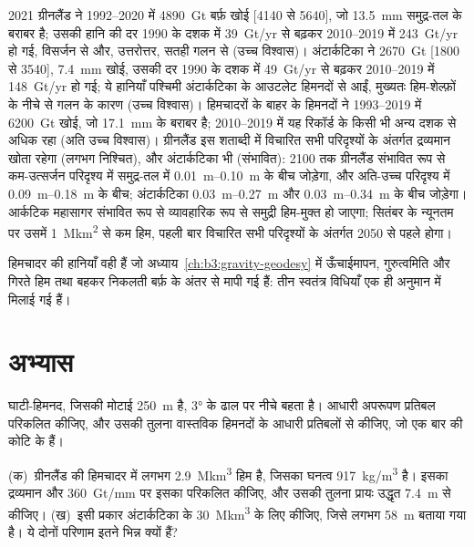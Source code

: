 \begin{dated}{2021}
ग्रीनलैंड ने 1992--2020 में \qty{4890}{Gt} बर्फ़ खोई [4140 से 5640],
जो \qty{13.5}{mm} समुद्र-तल के बराबर है; उसकी हानि की दर 1990 के दशक में \qty{39}{Gt/yr} से
बढ़कर 2010--2019 में \qty{243}{Gt/yr} हो गई, विसर्जन से और, उत्तरोत्तर,
सतही गलन से (उच्च विश्वास)। अंटार्कटिका ने \qty{2670}{Gt}
[1800 से 3540], \qty{7.4}{mm} खोई, उसकी दर 1990 के दशक में \qty{49}{Gt/yr} से
बढ़कर 2010--2019 में \qty{148}{Gt/yr} हो गई; ये हानियाँ पश्चिमी अंटार्कटिका के
आउटलेट हिमनदों से आईं, मुख्यतः हिम-शेल्फ़ों के नीचे से गलन के कारण (उच्च विश्वास)।
हिमचादरों के बाहर के हिमनदों ने 1993--2019 में \qty{6200}{Gt} खोई,
जो \qty{17.1}{mm} के बराबर है; 2010--2019 में यह रिकॉर्ड के
किसी भी अन्य दशक से अधिक रहा (अति उच्च विश्वास)। ग्रीनलैंड
इस शताब्दी में विचारित सभी परिदृश्यों के अंतर्गत द्रव्यमान खोता रहेगा (लगभग निश्चित), और
अंटार्कटिका भी (संभावित): 2100 तक ग्रीनलैंड संभावित रूप से कम-उत्सर्जन परिदृश्य में समुद्र-तल में
\qtyrange{0.01}{0.10}{m} के बीच जोड़ेगा, और अति-उच्च परिदृश्य में
\qtyrange{0.09}{0.18}{m} के बीच; अंटार्कटिका
\qtyrange{0.03}{0.27}{m} और \qtyrange{0.03}{0.34}{m} के बीच जोड़ेगा।
आर्कटिक महासागर संभावित रूप से व्यावहारिक रूप से समुद्री हिम-मुक्त हो जाएगा;
सितंबर के न्यूनतम पर उसमें \qty{1}{\mega km^2} से कम हिम, पहली बार
विचारित सभी परिदृश्यों के अंतर्गत 2050 से पहले होगा।
\end{dated}

हिमचादर की हानियाँ वही हैं जो अध्याय~\ref{ch:b3:gravity-geodesy} में
ऊँचाईमापन, गुरुत्वमिति और गिरते हिम तथा बहकर निकलती बर्फ़ के अंतर से मापी गई हैं:
तीन स्वतंत्र विधियाँ
एक ही अनुमान में मिलाई गई हैं।

\section{अभ्यास}

\begin{exercise}[$\star$]\label{exo:b3:glaciology:1}
घाटी-हिमनद, जिसकी मोटाई \qty{250}{m} है, \ang{3} के ढाल पर नीचे बहता है। आधारी अपरूपण प्रतिबल
परिकलित कीजिए, और उसकी तुलना वास्तविक हिमनदों के आधारी प्रतिबलों से
कीजिए, जो एक बार की कोटि के हैं।
\end{exercise}

\begin{exercise}[$\star$]\label{exo:b3:glaciology:2}
(क)~ग्रीनलैंड की हिमचादर में लगभग \qty{2.9}{\mega km^3} हिम है, जिसका
घनत्व \qty{917}{kg/m^3} है। इसका द्रव्यमान और \qty{360}{Gt/mm} पर इसका  परिकलित कीजिए,
और उसकी तुलना प्रायः उद्धृत \qty{7.4}{m} से कीजिए।
(ख)~इसी प्रकार अंटार्कटिका के \qty{30}{\mega km^3} के लिए कीजिए, जिसे लगभग
\qty{58}{m} बताया गया है। ये दोनों परिणाम इतने भिन्न क्यों हैं?
\end{exercise}

